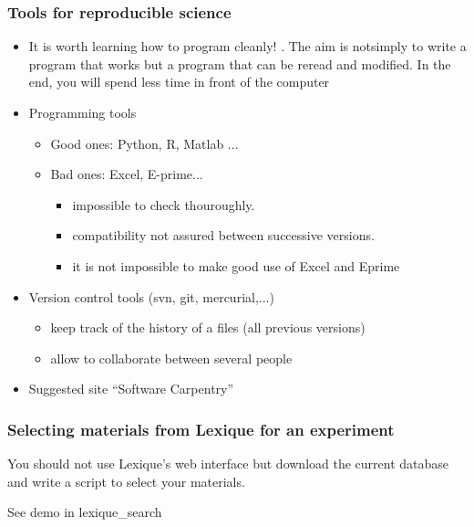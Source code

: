 \documentclass{beamer}
\begin{document}
\begin{frame}
\frametitle{Tools for reproducible science}


\begin{itemize}
  \item It is worth learning how to program cleanly! . The aim is notsimply to write a program that works but a program that can be reread and modified. In the end, you will spend less time in front of the computer

\pause

  \item Programming tools

    \begin{itemize}
    \item Good ones: Python, R, Matlab ...

    \item Bad ones: Excel, E-prime...

      \begin{itemize}
      \item impossible to check thouroughly.
      \item compatibility not assured between successive versions.
      \item it is not impossible to make good use of Excel and Eprime
        
      \end{itemize}
    \end{itemize}

\pause

  \item Version control tools (svn, git, mercurial,...)

    \begin{itemize}
    \item keep track of the history of a files (all previous versions)
    \item allow to collaborate between several people
    \end{itemize}

  \item Suggested site ``Software Carpentry''

\end{itemize}



\end{frame}


\begin{frame}[fragile]
\frametitle{Selecting materials from Lexique for an experiment}

You should not use Lexique's web interface but download the current database and write a script to select your materials.

See demo in lexique\_search

\end{frame}
\end{document}
